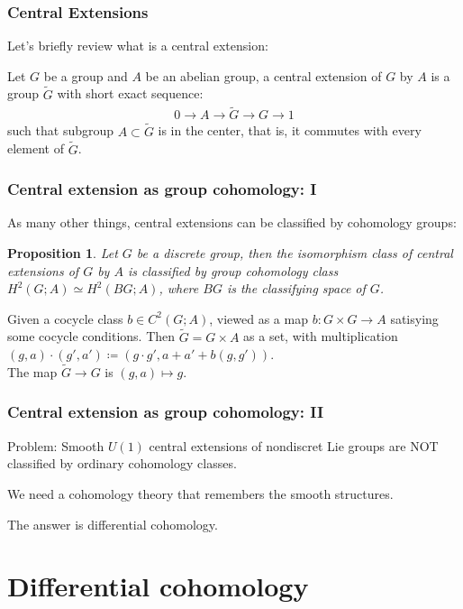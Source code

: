 \documentclass{beamer}
\newtheorem{prop}[equation]{Proposition}
\begin{document}
\begin{frame}
    \frametitle{Central Extensions}
    Let's briefly review what is a central extension: \pause
    \begin{definition}
        Let $G$ be a group and $A$ be an abelian group, a central extension of $G$
        by $A$ is a group $\tilde{G}$ with short exact sequence:
        \begin{eqnarray}
            0 \to A \to \tilde{G} \to G \to 1
        \end{eqnarray}
        such that subgroup $A \subset \tilde{G}$ is in the center, that is, 
        it commutes with every element of $\tilde{G}$.
    \end{definition}
\end{frame}

\begin{frame}
    \frametitle{Central extension as group cohomology: I}
    As many other things, central extensions can be classified by cohomology groups: \pause 
    
    \begin{prop}
        Let $G$ be a discrete group, then the isomorphism class of central extensions of $G$ by $A$ is 
        classified by group cohomology class $H^2(G; A) \simeq H^2(BG; A)$, where $BG$ is the 
        classifying space of $G$.
    \end{prop}\pause

    Given a cocycle class $b \in C^2(G;A)$, viewed as a map $b : G \times G \to A$ 
    satisying some cocycle conditions. Then $\tilde{G} = G \times A$ as a set, with multiplication 
    $(g, a) \cdot (g', a') \coloneqq (g \cdot g', a + a' + b(g, g'))$. \pause \\
    The map $\tilde{G} \to G$ is  $(g, a) \mapsto g$.
\end{frame}

\begin{frame}
    \frametitle{Central extension as group cohomology: II}
    \alert{Problem}:  Smooth $U(1)$ central extensions of nondiscret Lie groups are \alert{NOT} classified 
    by ordinary cohomology classes. \pause \vspace{5mm}

    We need a cohomology theory that remembers the smooth structures. \pause 

    \vspace{5mm} The answer is \alert{differential cohomology}.
\end{frame}


\section{Differential cohomology}
\end{document}
